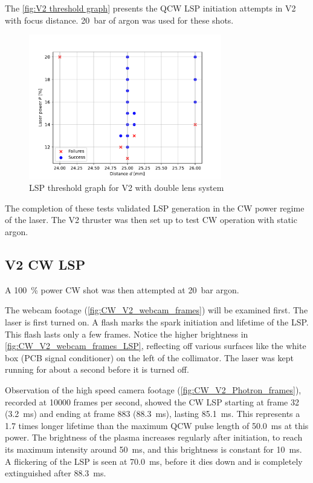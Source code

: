             The \autoref{fig:V2 threshold graph} presents the QCW LSP initiation attempts in V2 with focus distance. \qty{20}{bar} of argon was used for these shots.
            \begin{figure}[!ht]
                \centering
                \includegraphics[width=0.75\textwidth]{assets/4 experiments/V2_focus_threshold.pdf}
                \caption{LSP threshold graph for V2 with double lens system}
                \label{fig:V2 threshold graph}
            \end{figure}
            The completion of these tests validated LSP generation in the CW power regime of the laser. The V2 thruster was then set up to test CW operation with static argon.

        \subsection{V2 CW LSP}

            A \qty{100}{\%} power CW shot was then attempted at \qty{20}{bar} argon. 

            

            The webcam footage (\autoref{fig:CW_V2_webcam_frames}) will be examined first. The laser is first turned on. A flash marks the spark initiation and lifetime of the LSP. This flash lasts only a few frames. Notice the higher brightness in \autoref{fig:CW_V2_webcam_frames_LSP}, reflecting off various surfaces like the white box (PCB signal conditioner) on the left of the collimator. The laser was kept running for about a second before it is turned off.

            

            Observation of the high speed camera footage (\autoref{fig:CW_V2_Photron_frames}), recorded at 10000 frames per second, showed the CW LSP starting at frame 32 (\qty{3.2}{ms}) and ending at frame 883 (\qty{88.3}{ms}), lasting \qty{85.1}{ms}. This represents a 1.7 times longer lifetime than the maximum QCW pulse length of \qty{50.0}{ms} at this power. The brightness of the plasma increases regularly after initiation, to reach its maximum intensity around \qty{50}{ms}, and this brightness is constant for \qty{10}{ms}. A flickering of the LSP is seen at \qty{70.0}{ms}, before it dies down and is completely extinguished after \qty{88.3}{ms}.

